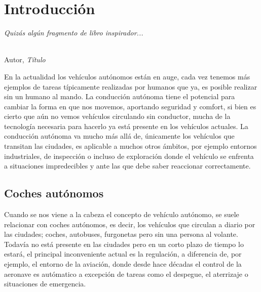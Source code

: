 \chapter{Introducción}
\label{cap:capitulo1}
\setcounter{page}{1}

\begin{flushright}
	\begin{minipage}[]{10cm}
		\emph{Quizás algún fragmento de libro inspirador...}\\
	\end{minipage}\\

	Autor, \textit{Título}\\
\end{flushright}

\vspace{1cm}

En la actualidad los vehículos autónomos están en auge, cada vez tenemos más ejemplos de tareas típicamente realizadas por humanos que ya, es posible realizar sin un humano al mando. La conducción autónoma tiene el potencial para cambiar la forma en que nos movemos, aportando seguridad y comfort, si bien es cierto que aún no vemos vehículos circulando sin conductor, mucha de la tecnología necesaria para hacerlo ya está presente en los vehículos actuales. La conducción autónoma va mucho más allá de, únicamente los vehículos que transitan las ciudades, es aplicable a muchos otros ámbitos, por ejemplo entornos industriales, de inspección o incluso de exploración donde el vehículo se enfrenta a situaciones impredecibles y ante las que debe saber reaccionar correctamente.\\

\section{Coches autónomos}
\label{sec:cochesautonomos} %
Cuando se nos viene a la cabeza el concepto de vehículo autónomo, se suele relacionar con coches autónomos, es decir, los vehículos que circulan a diario por las ciudades; coches, autobuses, furgonetas pero sin una persona al volante. Todavía no está presente en las ciudades pero en un corto plazo de tiempo lo estará, el principal inconveniente actual es la regulación, a diferencia de, por ejemplo, el entorno de la aviación, donde desde hace décadas el control de la aeronave es autómatico a excepción de tareas como el despegue, el aterrizaje o situaciones de emergencia.\\

